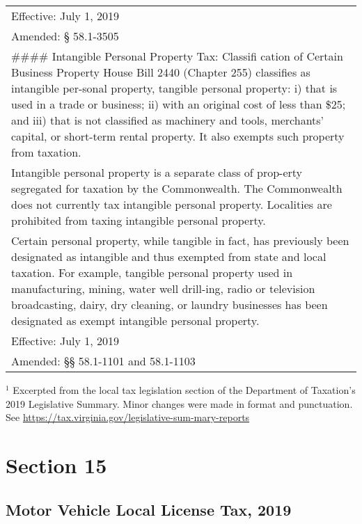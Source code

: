 \documentclass[
]{book}
\begin{document}
\begin{longtable}[]{@{}
  >{\raggedright\arraybackslash}p{}@{}}
Effective: July 1, 2019 \\
Amended: § 58.1-3505 \\
\#\#\#\# Intangible Personal Property Tax: Classifi cation of Certain Business Property
House Bill 2440 (Chapter 255) classifies as intangible per-sonal property, tangible personal property: i) that is used in a trade or business; ii) with an original cost of less than \$25; and iii) that is not classified as machinery and tools, merchants' capital, or short-term rental property. It also exempts such property from taxation. \\
Intangible personal property is a separate class of prop-erty segregated for taxation by the Commonwealth. The Commonwealth does not currently tax intangible personal property. Localities are prohibited from taxing intangible personal property. \\
Certain personal property, while tangible in fact, has previously been designated as intangible and thus exempted from state and local taxation. For example, tangible personal property used in manufacturing, mining, water well drill-ing, radio or television broadcasting, dairy, dry cleaning, or laundry businesses has been designated as exempt intangible personal property. \\
Effective: July 1, 2019 \\
Amended: §§ 58.1-1101 and 58.1-1103 \\
\bottomrule
\end{longtable}

\(^1\) Excerpted from the local tax legislation section of the Department of Taxation's 2019 Legislative Summary. Minor changes were made in format and punctuation. See \url{https://tax.virginia.gov/legislative-sum-mary-reports}

\hypertarget{section-15}{%
\chapter{Section 15}\label{section-15}}

\hypertarget{motor-vehicle-local-license-tax-2019}{%
\section{Motor Vehicle Local License Tax, 2019}\label{motor-vehicle-local-license-tax-2019}}
\end{document}
